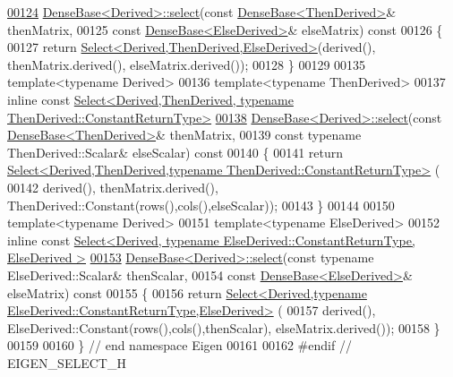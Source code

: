 \begin{DoxyCode}
\hyperlink{group___core___module_a65e78cfcbc9852e6923bebff4323ddca}{00124} \hyperlink{group___core___module_a65e78cfcbc9852e6923bebff4323ddca}{DenseBase<Derived>::select}(\textcolor{keyword}{const} 
      \hyperlink{group___core___module_class_eigen_1_1_dense_base}{DenseBase<ThenDerived>}& thenMatrix,
00125                             \textcolor{keyword}{const} \hyperlink{group___core___module_class_eigen_1_1_dense_base}{DenseBase<ElseDerived>}& elseMatrix)\textcolor{keyword}{ const}
00126 \textcolor{keyword}{}\{
00127   \textcolor{keywordflow}{return} \hyperlink{group___core___module_class_eigen_1_1_select}{Select<Derived,ThenDerived,ElseDerived>}(derived(), 
      thenMatrix.derived(), elseMatrix.derived());
00128 \}
00129 
00135 \textcolor{keyword}{template}<\textcolor{keyword}{typename} Derived>
00136 \textcolor{keyword}{template}<\textcolor{keyword}{typename} ThenDerived>
00137 \textcolor{keyword}{inline} \textcolor{keyword}{const} 
      \hyperlink{group___core___module_class_eigen_1_1_select}{Select<Derived,ThenDerived, typename ThenDerived::ConstantReturnType>}
\hyperlink{group___core___module_a57ef09a843004095f84c198dd145641b}{00138} \hyperlink{group___core___module_a65e78cfcbc9852e6923bebff4323ddca}{DenseBase<Derived>::select}(\textcolor{keyword}{const} 
      \hyperlink{group___core___module_class_eigen_1_1_dense_base}{DenseBase<ThenDerived>}& thenMatrix,
00139                            \textcolor{keyword}{const} \textcolor{keyword}{typename} ThenDerived::Scalar& elseScalar)\textcolor{keyword}{ const}
00140 \textcolor{keyword}{}\{
00141   \textcolor{keywordflow}{return} \hyperlink{group___core___module_class_eigen_1_1_select}{Select<Derived,ThenDerived,typename ThenDerived::ConstantReturnType>}
      (
00142     derived(), thenMatrix.derived(), ThenDerived::Constant(rows(),cols(),elseScalar));
00143 \}
00144 
00150 \textcolor{keyword}{template}<\textcolor{keyword}{typename} Derived>
00151 \textcolor{keyword}{template}<\textcolor{keyword}{typename} ElseDerived>
00152 \textcolor{keyword}{inline} \textcolor{keyword}{const} 
      \hyperlink{group___core___module_class_eigen_1_1_select}{Select<Derived, typename ElseDerived::ConstantReturnType, ElseDerived >}
\hyperlink{group___core___module_a9e8e78c75887d4539071a0b7a61ca103}{00153} \hyperlink{group___core___module_a65e78cfcbc9852e6923bebff4323ddca}{DenseBase<Derived>::select}(\textcolor{keyword}{const} \textcolor{keyword}{typename} ElseDerived::Scalar& thenScalar,
00154                            \textcolor{keyword}{const} \hyperlink{group___core___module_class_eigen_1_1_dense_base}{DenseBase<ElseDerived>}& elseMatrix)\textcolor{keyword}{ const}
00155 \textcolor{keyword}{}\{
00156   \textcolor{keywordflow}{return} \hyperlink{group___core___module_class_eigen_1_1_select}{Select<Derived,typename ElseDerived::ConstantReturnType,ElseDerived>}
      (
00157     derived(), ElseDerived::Constant(rows(),cols(),thenScalar), elseMatrix.derived());
00158 \}
00159 
00160 \} \textcolor{comment}{// end namespace Eigen}
00161 
00162 \textcolor{preprocessor}{#endif // EIGEN\_SELECT\_H}
\end{DoxyCode}
